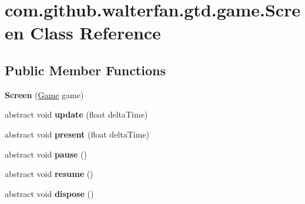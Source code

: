 \hypertarget{classcom_1_1github_1_1walterfan_1_1gtd_1_1game_1_1Screen}{\section{com.\-github.\-walterfan.\-gtd.\-game.\-Screen Class Reference}
\label{classcom_1_1github_1_1walterfan_1_1gtd_1_1game_1_1Screen}
}
\subsection*{Public Member Functions}
\begin{DoxyCompactItemize}
\item 
\hypertarget{classcom_1_1github_1_1walterfan_1_1gtd_1_1game_1_1Screen_a06ff9955ff08b7aacbe71bd79f40b52b}{{\bfseries Screen} (\hyperlink{interfacecom_1_1github_1_1walterfan_1_1gtd_1_1game_1_1Game}{Game} game)}\label{classcom_1_1github_1_1walterfan_1_1gtd_1_1game_1_1Screen_a06ff9955ff08b7aacbe71bd79f40b52b}

\item 
\hypertarget{classcom_1_1github_1_1walterfan_1_1gtd_1_1game_1_1Screen_a124881a27f3de26e5082c28e6dfa4a06}{abstract void {\bfseries update} (float delta\-Time)}\label{classcom_1_1github_1_1walterfan_1_1gtd_1_1game_1_1Screen_a124881a27f3de26e5082c28e6dfa4a06}

\item 
\hypertarget{classcom_1_1github_1_1walterfan_1_1gtd_1_1game_1_1Screen_a548c3b3a42d508ef1f6d1cb9d1aa9fbd}{abstract void {\bfseries present} (float delta\-Time)}\label{classcom_1_1github_1_1walterfan_1_1gtd_1_1game_1_1Screen_a548c3b3a42d508ef1f6d1cb9d1aa9fbd}

\item 
\hypertarget{classcom_1_1github_1_1walterfan_1_1gtd_1_1game_1_1Screen_aad708808269151efd008ea646b643ab2}{abstract void {\bfseries pause} ()}\label{classcom_1_1github_1_1walterfan_1_1gtd_1_1game_1_1Screen_aad708808269151efd008ea646b643ab2}

\item 
\hypertarget{classcom_1_1github_1_1walterfan_1_1gtd_1_1game_1_1Screen_ab15c90fb24b27419bf8fff912cf7229f}{abstract void {\bfseries resume} ()}\label{classcom_1_1github_1_1walterfan_1_1gtd_1_1game_1_1Screen_ab15c90fb24b27419bf8fff912cf7229f}

\item 
\hypertarget{classcom_1_1github_1_1walterfan_1_1gtd_1_1game_1_1Screen_aef8d56408a3f67455edd8beb13a60d8b}{abstract void {\bfseries dispose} ()}\label{classcom_1_1github_1_1walterfan_1_1gtd_1_1game_1_1Screen_aef8d56408a3f67455edd8beb13a60d8b}

\end{DoxyCompactItemize}
